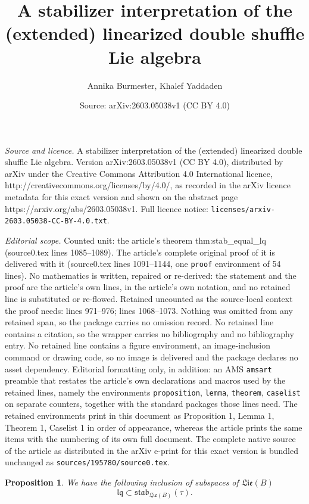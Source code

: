 \documentclass[10pt,a4paper]{amsart}
\title{A stabilizer interpretation of the (extended) linearized double shuffle Lie algebra}
\author{Annika Burmester, Khalef Yaddaden}
\date{Source: arXiv:2603.05038v1 (CC BY 4.0)}
\newtheorem{proposition}{Proposition}
\newcommand{\Lie}{\mathfrak{Lie}}
\newcommand{\lqq}{\mathfrak{lq}}
\newcommand{\stab}{\mathfrak{stab}}
\begin{document}
\maketitle

\noindent\emph{Source and licence.} A stabilizer interpretation of the (extended) linearized double shuffle Lie algebra. Version arXiv:2603.05038v1 (CC BY 4.0), distributed by arXiv under the Creative Commons Attribution 4.0 International licence, http://creativecommons.org/licenses/by/4.0/, as recorded in the arXiv licence metadata for this exact version and shown on the abstract page https://arxiv.org/abs/2603.05038v1. Full licence notice: \texttt{licenses/arxiv-2603.05038-CC-BY-4.0.txt}.\par\smallskip

\noindent\textit{Editorial scope.} Counted unit: the article's theorem thm:stab\_equal\_lq (source0.tex lines 1085--1089). The article's complete original proof of it is delivered with it (source0.tex lines 1091--1144, one \texttt{proof} environment of 54 lines). No mathematics is written, repaired or re-derived: the statement and the proof are the article's own lines, in the article's own notation, and no retained line is substituted or re-flowed.  Retained uncounted as the source-local context the proof needs: lines 971--976; lines 1068--1073.  Nothing was omitted from any retained span, so the package carries no omission record.  No retained line contains a citation, so the wrapper carries no bibliography and no bibliography entry.  No retained line contains a figure environment, an image-inclusion command or drawing code, so no image is delivered and the package declares no asset dependency.  Editorial formatting only, in addition: an AMS \texttt{amsart} preamble that restates the article's own declarations and macros used by the retained lines, namely the environments \texttt{proposition}, \texttt{lemma}, \texttt{theorem}, \texttt{caselist} on separate counters, together with the standard packages those lines need.  The retained environments print in this document as Proposition 1, Lemma 1, Theorem 1, Caselist 1 in order of appearance, whereas the article prints the same items with the numbering of its own full document.  The complete native source of the article as distributed in the arXiv e-print for this exact version is bundled unchanged as \texttt{sources/195780/source0.tex}.
\begin{proposition} \label{prop:lq_subset_stab}
We have the following inclusion of subspaces of $\Lie(B)$
\[
\lqq\subset \stab_{\Lie(B)}(\tau).
\]
\end{proposition}
\end{document}
